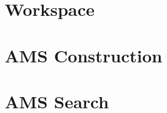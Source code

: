 {
\let\clearpage\relax
\let\newpage\relax
\let\pagebreak\relax

\section{Workspace}


\section{AMS Construction}


\section{AMS Search}



}